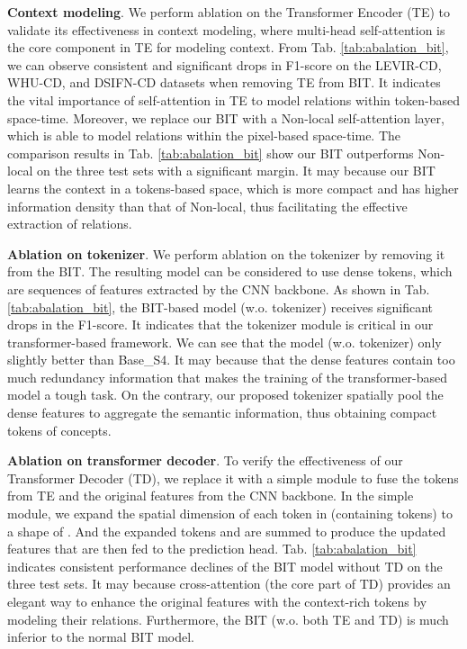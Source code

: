 \documentclass[journal]{IEEEtran}
\begin{document}
\textbf{Context modeling}. We perform ablation on the Transformer Encoder (TE) to validate its effectiveness in context modeling, where multi-head self-attention is the core component in TE for modeling context. From Tab. \ref{tab:abalation_bit}, we can observe consistent and significant drops in F1-score on the LEVIR-CD, WHU-CD, and DSIFN-CD datasets when removing TE from BIT. It indicates the vital importance of self-attention in TE to model relations within token-based space-time. Moreover, we replace our BIT with a Non-local \cite{Wang2018b} self-attention layer, which is able to model relations within the pixel-based space-time. The comparison results in Tab. \ref{tab:abalation_bit} show our BIT outperforms Non-local on the three test sets with a significant margin. It may because our BIT learns the context in a tokens-based space, which is more compact and has higher information density than that of Non-local, thus facilitating the effective extraction of relations.


\textbf{Ablation on tokenizer}. We perform ablation on the tokenizer by removing it from the BIT. The resulting model can be considered to use dense tokens, which are sequences of features extracted by the CNN backbone. As shown in Tab. \ref{tab:abalation_bit}, the BIT-based model (w.o. tokenizer) receives significant drops in the F1-score. It indicates that the tokenizer module is critical in our transformer-based framework. We can see that the model (w.o. tokenizer) only slightly better than Base\_S4. It may because that the dense features contain too much redundancy information that makes the training of the transformer-based model a tough task. On the contrary, our proposed tokenizer spatially pool the dense features to aggregate the semantic information, thus obtaining compact tokens of concepts. 

\textbf{Ablation on transformer decoder}. To verify the effectiveness of our Transformer Decoder (TD), we replace it with a simple module to fuse the tokens  from TE and the original features  from the CNN backbone. In the simple module, we expand the spatial dimension of each token in  (containing  tokens) to a shape of . And the  expanded tokens and  are summed to produce the updated features that are then fed to the prediction head. Tab. \ref{tab:abalation_bit} indicates consistent performance declines of the BIT model without TD on the three test sets. It may because cross-attention (the core part of TD) provides an elegant way to enhance the original features with the context-rich tokens by modeling their relations. Furthermore, the BIT (w.o. both TE and TD) is much inferior to the normal BIT model.
\end{document}
